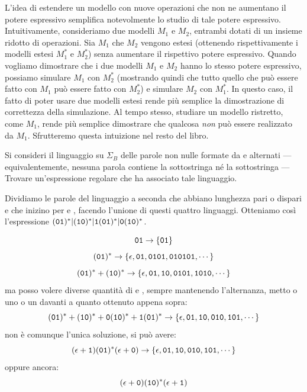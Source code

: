 L'idea di estendere un modello con nuove operazioni che non ne aumentano il potere espressivo semplifica notevolmente lo
studio di tale potere espressivo.
Intuitivamente, consideriamo due modelli $M_{1}$ e $M_2$, entrambi dotati di un insieme ridotto di operazioni.
Sia $M_1$ che $M_2$ vengono estesi (ottenendo rispettivamente i modelli estesi $M_1^{*}$ e $M_2^{*}$) senza aumentare il
rispettivo potere espressivo.
Quando vogliamo dimostrare che i due modelli $M_1$ e $M_2$ hanno lo stesso potere espressivo, possiamo simulare $M_1$
con $M_2^{*}$ (mostrando quindi che tutto quello che può essere fatto con $M_1$ può essere fatto con $M_2^{*}$) e
simulare $M_2$ con $M_1^{*}$.
In questo caso, il fatto di poter usare due modelli estesi rende più semplice la dimostrazione di correttezza della simulazione.
Al tempo stesso, studiare un modello ristretto, come $M_1$, rende più semplice dimostrare che qualcosa \emph{non} può
essere realizzato da $M_1$.
Sfrutteremo questa intuizione nel resto del libro.


\begin{example}\label{exa:01}
	Si consideri il linguaggio su $\Sigma_{B}$ delle parole non nulle formate da  \zero e \uno alternati --- equivalentemente, nessuna
	parola contiene la sottostringa \zero\zero né la sottostringa \uno\uno ---
	Trovare un'espressione regolare che ha associato tale linguaggio.

	Dividiamo le parole del linguaggio a seconda che abbiano lunghezza pari o dispari e che inizino per \zero e
	\uno, facendo l'unione di questi quattro linguaggi.
	Otteniamo così l'espressione $(\mathtt{0}\mathtt{1})^* | (\mathtt{1}\mathtt{0})^* | \mathtt{1}(\mathtt{0}\mathtt{1})^* | \mathtt{0}(\mathtt{1}\mathtt{0})^*$.

	\[\mathtt{0}\mathtt{1}\to \{\mathtt{0}\mathtt{1}\}\]
	$$(\mathtt{0}\mathtt{1})^*\to \{\epsilon, \mathtt{0}\mathtt{1}, \mathtt{0}\mathtt{1}\mathtt{0}\mathtt{1},\mathtt{0}\mathtt{1}\mathtt{0}\mathtt{1}\mathtt{0}\mathtt{1},\cdots\}$$
	$$(\mathtt{0}\mathtt{1})^{*} + (\mathtt{1}\mathtt{0})^{*} \to \{ \epsilon, \mathtt{0}\mathtt{1},\mathtt{1}\mathtt{0},\mathtt{0}\mathtt{1}\mathtt{0}\mathtt{1},\mathtt{1}\mathtt{0}\mathtt{1}\mathtt{0}, \cdots \} $$
	ma posso volere diverse quantità di \zero e \uno, sempre mantenendo l'alternanza, metto o uno \zero o un \uno davanti a quanto ottenuto appena sopra:
	$$(\mathtt{0}\mathtt{1})^*+(\mathtt{1}\mathtt{0})^*+\mathtt{0}(\mathtt{1}\mathtt{0})^*+\mathtt{1}(\mathtt{0}\mathtt{1})^*\to \{\epsilon,\mathtt{0}\mathtt{1},\mathtt{1}\mathtt{0},\mathtt{0}\mathtt{1}\mathtt{0},\mathtt{1}\mathtt{0}\mathtt{1},\cdots\}$$
	non è comunque l'unica soluzione, si può avere:
	$$(\epsilon+\mathtt{1})(\mathtt{0}\mathtt{1})^*(\epsilon+\mathtt{0})\to \{\epsilon,\mathtt{0}\mathtt{1},\mathtt{1}\mathtt{0},\mathtt{0}\mathtt{1}\mathtt{0},\mathtt{1}\mathtt{0}\mathtt{1},\cdots\}$$
	oppure ancora:
	$$(\epsilon+\mathtt{0})(\mathtt{1}\mathtt{0})^*(\epsilon+\mathtt{1})$$
\end{example}


